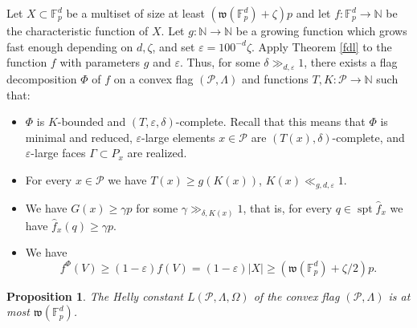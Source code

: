 \documentclass{daj}
\renewcommand{\ge}{\geqslant}
\newcommand{\w}{\mathfrak w}
\newcommand{\N}{\mathbb N}
\newcommand{\FF}{\mathbb F}
\renewcommand{\P}{\mathcal P}
\newtheorem{prop}[theorem]{Proposition}
\theoremstyle{definition}
\theoremstyle{remark}
\theoremstyle{definition}
\theoremstyle{definition}
\begin{document}
Let $X \subset \FF_p^d$ be a multiset of size at least $(\w(\FF_p^d)+\zeta) p$ and let $f: \FF_p^d \rightarrow \N$ be the characteristic function of $X$. Let $g: \N \rightarrow \N$ be a growing function which grows fast enough depending on $d, \zeta$, and set $\varepsilon = 100^{-d}\zeta$. Apply Theorem \ref{fdl} to the function $f$ with parameters $g$ and $\varepsilon$. Thus, for some $\delta \gg_{d, \varepsilon} 1$, there exists a flag decomposition $\Phi$ of $f$ on a convex flag $(\P, \Lambda)$ and functions $T, K: \P\rightarrow \N$ such that:
\begin{itemize}
    \item $\Phi$ is $K$-bounded and $(T, \varepsilon, \delta)$-complete. Recall that this means that $\Phi$ is minimal and reduced, $\varepsilon$-large elements $x\in \P$ are $(T(x),\delta)$-complete, and $\varepsilon$-large faces $\Gamma \subset P_x$ are realized.
    \item For every $x \in \P$ we have $T(x) \ge g(K(x))$, $K(x) \ll_{g, d, \varepsilon} 1$.%
    
    \item We have $G(x) \ge \gamma p$ for some $\gamma \gg_{\delta, K(x)} 1$, that is, for every $q \in \operatorname{spt}\hat f_x$ we have $\hat f_x(q) \ge \gamma p$.
    \item We have 
\begin{equation}\label{sharp}
f^{\Phi}(V) \ge (1-\varepsilon) f(V) = (1-\varepsilon) |X| \ge (\w(\FF_p^d) + \zeta /2) p.    
\end{equation}
\end{itemize}



\begin{prop}\label{lbound}
The Helly constant $L(\P, \Lambda, \Omega)$ of the convex flag $(\P, \Lambda)$ is at most $\w(\FF_p^d)$.
\end{prop}
\end{document}
